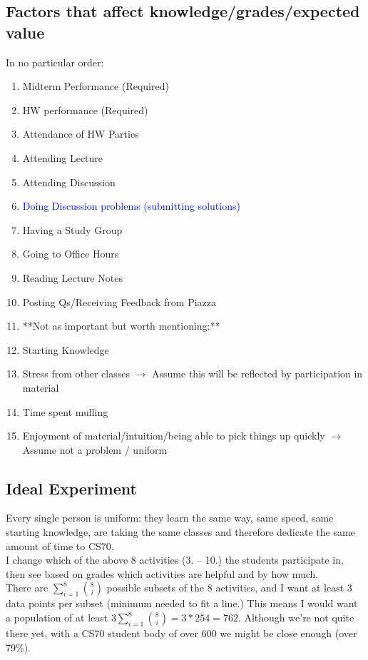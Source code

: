 \documentclass[leqno]{article}
\begin{document}
\subsection{Factors that affect knowledge/grades/expected value}
In no particular order:
\begin{enumerate}
\item Midterm Performance (Required)
\item HW performance (Required)
\item Attendance of HW Parties
\item Attending Lecture
\item Attending Discussion
\item \textcolor{blue}{Doing Discussion problems (submitting solutions)}
\item Having a Study Group
\item Going to Office Hours
\item Reading Lecture Notes
\item Posting Qs/Receiving Feedback from Piazza
\item[] **Not as important but worth mentioning:**
\item Starting Knowledge
\item Stress from other classes $\rightarrow$ Assume this will be reflected by participation in material
\item[]  Time spent mulling
\item Enjoyment of material/intuition/being able to pick things up quickly $\rightarrow$ Assume not a problem / uniform
\end{enumerate}

\subsection{Ideal Experiment}
Every single person is uniform: they learn the same way, same speed, same starting knowledge, are taking the same classes and therefore dedicate the same amount of time to CS70.\\

I change which of the above 8 activities (3. -- 10.) the students participate in, then see based on grades which activities are helpful and by how much.\\

There are $\sum_{i=1}^8 {8 \choose i}$ possible subsets of the 8 activities, and I want at least 3 data points per subset (minimum needed to fit a line.) This means I would want a population of at least $3\sum_{i=1}^8 {8 \choose i} = 3*254 = 762$. Although we're not quite there yet, with a CS70 student body of over 600 we might be close enough (over 79\%).
\end{document}
